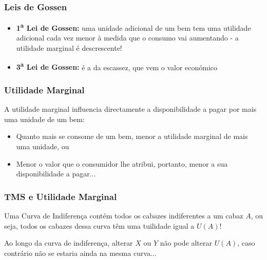 \begin{frame}
	\frametitle{Leis de Gossen}
	\begin{itemize}
		\item \textbf{1\textsuperscript{a} Lei de Gossen:} uma unidade adicional de um bem tem uma utilidade adicional cada vez menor \`a medida que o consumo vai aumentando - a utilidade marginal \'e descrescente!
		\item<2->\textbf{3\textsuperscript{a} Lei de Gossen:} \'e a da escassez, que vem o valor econ\'omico
	\end{itemize}
\end{frame}

\begin{frame}
	\frametitle{Utilidade Marginal}
	A utilidade marginal influencia directamente a disponibilidade a pagar por mais uma unidade de um bem:
	\begin{itemize}
		\item<2->Quanto mais se consome de um bem, menor a utilidade marginal de mais uma unidade, ou
		\item<3-> Menor o valor que o consumidor lhe atribui, portanto, menor a sua disponibilidade a pagar...
	\end{itemize}
\end{frame}

\begin{frame}
	\frametitle{TMS e Utilidade Marginal}
	Uma Curva de Indiferen\c ca cont\'em todos os cabazes indiferentes a um cabaz $A$, ou seja, todos os cabazes dessa curva t\^em uma tuilidade igual a $U(A)$!

	\vspace{0.2cm}

	Ao longo da curva de indiferen\c ca, alterar $X$ ou $Y$ n\~ao pode alterar $U(A)$, caso contr\'ario n\~ao se estaria ainda na mesma curva...
\end{frame}

